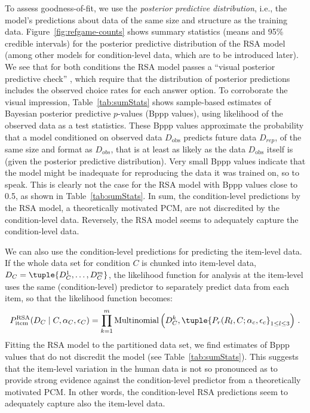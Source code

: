 \documentclass[fleqn]{article}
\begin{document}
To assess goodness-of-fit, we use the \emph{posterior predictive distribution}, i.e., the model's predictions about data of the same size and structure as the training data.
Figure~\ref{fig:refgame-counts} shows summary statistics (means and 95\% credible intervals) for the posterior predictive distribution of the RSA model (among other models for condition-level data, which are to be introduced later).
We see that for both conditions the RSA model passes a ``visual posterior predictive check'' \citep{Kruschke2011:Doing-Bayesian-}, which require that the distribution of posterior predictions includes the observed choice rates for each answer option.
To corroborate the visual impression, Table~\ref{tab:sumStats} shows sample-based estimates of Bayesian posterior predictive $p$-values (Bppp values), using likelihood of the observed data as a test statistics.
These Bppp values approximate the probability that a model conditioned on observed data $D_{\text{obs}}$ predicts future data $D_{rep}$, of the same size and format as $D_{obs}$, that is at least as likely as the data $D_{\text{obs}}$ itself is (given the posterior predictive distribution).
Very small Bppp values indicate that the model might be inadequate for reproducing the data it was trained on, so to speak.
This is clearly not the case for the RSA model with Bppp values close to 0.5, as shown in Table~\ref{tab:sumStats}.
In sum, the condition-level predictions by the RSA model, a theoretically motivated PCM, are not discredited by the condition-level data.
Reversely, the RSA model seems to adequately capture the condition-level data.

We can also use the condition-level predictions for predicting the item-level data.
If the whole data set for condition $C$ is chunked into item-level data, $D_{C} = \tuple{D^{1}_{C}, \dots, D^{m}_{C} }$, the likelihood function for analysis at the item-level uses the same (condition-level) predictor to separately predict data from each item, so that the likelihood function becomes:
%
\begin{align*}
 P^{\text{RSA}}_{\text{item}}(D_{C} \mid C, \alpha_{C}, \epsilon_{C}) = \prod_{k = 1}^{m} \text{Multinomial} \left (D_{C}^{k}, \tuple{P_{r}(R_{l}, C; \alpha_{c}, \epsilon_{c}}_{1 \le l \le 3} \right )\,.
\end{align*}
%
Fitting the RSA model to the partitioned data set, we find estimates of Bppp values that do not discredit the model (see Table~\ref{tab:sumStats}).
This suggests that the item-level variation in the human data is not so pronounced as to provide strong evidence against the condition-level predictor from a theoretically motivated PCM.
In other words, the condition-level RSA predictions seem to adequately capture also the item-level data.
\end{document}
